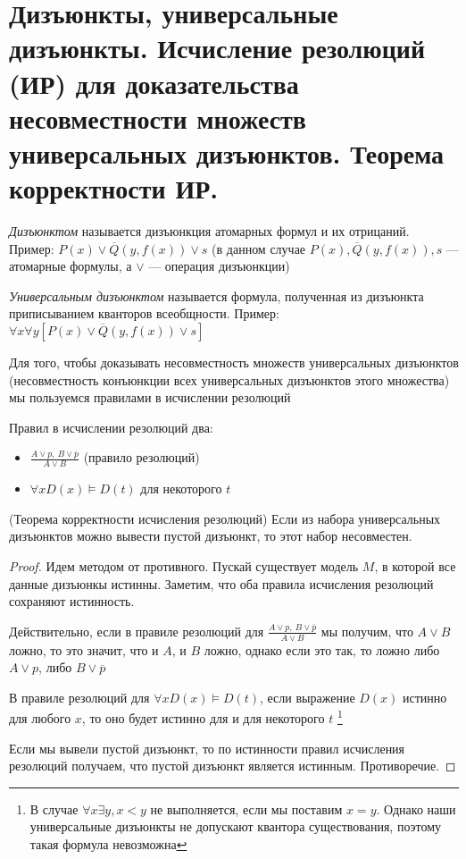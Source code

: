 \documentclass{article}
\begin{document}
\section{Дизъюнкты, универсальные дизъюнкты. Исчисление резолюций (ИР) для доказательства несовместности множеств универсальных дизъюнктов. Теорема корректности ИР.}
\begin{definition}
	\textit{Дизъюнктом} называется дизъюнкция атомарных формул и их отрицаний.\\
	Пример: \(P(x) \vee \overline Q(y, f(x)) \vee s\) (в данном случае \(P(x), \overline Q(y, f(x)), s\) --- атомарные формулы, а \(\vee\) --- операция дизъюнкции)
\end{definition}
\begin{definition}
	\textit{Универсальным дизъюнктом} называется формула, полученная из дизъюнкта приписыванием кванторов всеобщности. Пример: \(\forall x\forall y [P(x) \vee \overline Q(y, f(x)) \vee s]\)
\end{definition}
Для того, чтобы доказывать несовместность множеств универсальных дизъюнктов (несовместность конъюнкции всех универсальных дизъюнктов этого множества) мы пользуемся правилами в исчислении резолюций
\vspace{2mm}

Правил в исчислении резолюций два:
\begin{itemize}
	\item \(\tfrac{A \vee p,\ B \vee \overline p}{A \vee B}\) (правило резолюций)
	\item \(\forall x D(x) \vDash D(t)\) для некоторого \(t\)
\end{itemize}

\begin{theorem}{(Теорема корректности исчисления резолюций)}
	Если из набора универсальных дизъюнктов можно вывести пустой дизъюнкт, то этот набор несовместен.
\end{theorem}
\begin{proof}
	Идем методом от противного. Пускай существует модель \(M\), в которой все данные дизъюнкы истинны.
	Заметим, что оба правила исчисления резолюций сохраняют истинность.

	Действительно, если в правиле резолюций для \(\tfrac{A \vee p,\ B \vee \overline p}{A \vee B}\) мы получим, что \(A \vee B\) ложно, то это значит, что и \(A\), и \(B\) ложно, однако если это так, то ложно либо \(A \vee p\), либо \(B \vee \overline p\)

	В правиле резолюций для \(\forall x D(x) \vDash D(t)\), если выражение \(D(x)\) истинно для любого
    \(x\), то оно будет истинно для и для некоторого \(t\) \footnote{В случае \(\forall x \exists y, x < y\) не выполняется, если мы поставим \(x = y\). Однако наши универсальные дизъюнкты не допускают квантора существования, поэтому такая формула невозможна}

	Если мы вывели пустой дизъюнкт, то по истинности правил исчисления резолюций получаем, что пустой дизъюнкт является истинным. Противоречие.
\end{proof}
\end{document}
